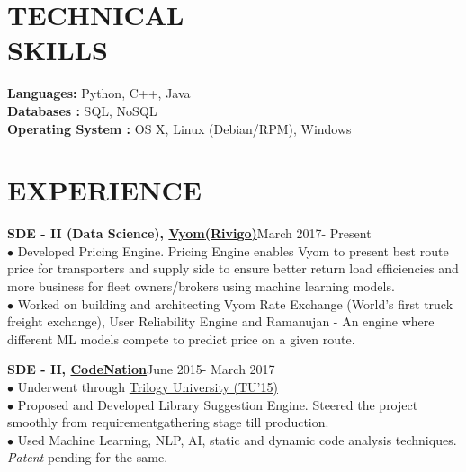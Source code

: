\documentclass[margin,line]{resume}
\begin{document}
\begin{resume}
    \section{\mysidestyle \bf TECHNICAL \\ SKILLS} 
    {\bf Languages:} Python, C++, Java
    \\ {\bf Databases :} SQL, NoSQL
     \\ {\bf Operating System :} OS X, Linux (Debian/RPM), Windows
   
    \section{\mysidestyle \bf EXPERIENCE}
    {\bf SDE - II (Data Science), \href{https://www.vyom.com/}{Vyom}\href{https://www.rivigo.com/}{(Rivigo)}}\hfill March 2017- Present\\
      $\bullet$ Developed Pricing Engine. Pricing Engine enables Vyom to present best route price for transporters and supply side to ensure better return load efficiencies and more business for fleet owners/brokers using machine learning models.\\
  $\bullet$ Worked on building and architecting Vyom Rate Exchange (World's first truck freight exchange), User Reliability Engine and Ramanujan - An engine where different ML models compete to predict price on a given route.

{\bf SDE - II, \href{http://codenation.co.in/}{CodeNation}}\hfill June 2015- March 2017\\
      $\bullet$ Underwent through \href{https://hbr.org/2001/04/no-ordinary-boot-camp}{Trilogy University (TU'15)}\\
	$\bullet$ Proposed and Developed Library Suggestion Engine. Steered the project smoothly from requirement\linebreak gathering stage till production. \\
	$\bullet$ Used Machine Learning, NLP, AI, static and dynamic code analysis techniques. \emph{Patent} pending for the same.
    

\end{resume}
\end{document}
